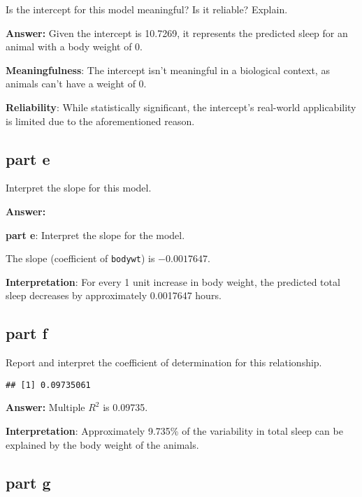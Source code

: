 \documentclass[
]{article}
\newenvironment{Shaded}{\begin{snugshade}}{\end{snugshade}}
\newcommand{\FunctionTok}[1]{\textcolor[rgb]{0.13,0.29,0.53}{\textbf{#1}}}
\newcommand{\NormalTok}[1]{#1}
\newcommand{\OtherTok}[1]{\textcolor[rgb]{0.56,0.35,0.01}{#1}}
\newcommand{\SpecialCharTok}[1]{\textcolor[rgb]{0.81,0.36,0.00}{\textbf{#1}}}
\begin{document}
Is the intercept for this model meaningful? Is it reliable? Explain.

\textbf{Answer:} Given the intercept is 10.7269, it represents the
predicted sleep for an animal with a body weight of 0.

\textbf{Meaningfulness}: The intercept isn't meaningful in a biological
context, as animals can't have a weight of 0.

\textbf{Reliability}: While statistically significant, the intercept's
real-world applicability is limited due to the aforementioned reason.

\subsection{part e}\label{part-e}

Interpret the slope for this model.

\textbf{Answer:}

\textbf{part e}: Interpret the slope for the model.

The slope (coefficient of \texttt{bodywt}) is \(-0.0017647\).

\textbf{Interpretation}: For every 1 unit increase in body weight, the
predicted total sleep decreases by approximately 0.0017647 hours.

\subsection{part f}\label{part-f}

Report and interpret the coefficient of determination for this
relationship.

\begin{Shaded}
\end{Shaded}

\begin{verbatim}
## [1] 0.09735061
\end{verbatim}

\textbf{Answer:} Multiple \(R^2\) is 0.09735.

\textbf{Interpretation}: Approximately 9.735\% of the variability in
total sleep can be explained by the body weight of the animals.

\subsection{part g}\label{part-g}
\end{document}
